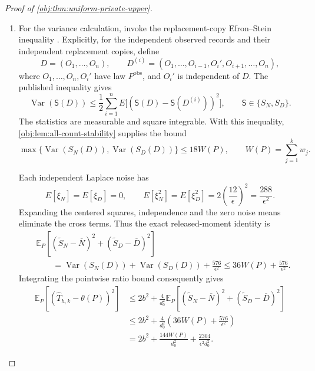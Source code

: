 \documentclass[11pt]{article}
\begin{document}
\begin{proof}[Proof of \cref{obj:thm:uniform-private-upper}]
\begin{enumerate}
\item
For the variance calculation, invoke the replacement-copy Efron--Stein inequality \citep[Theorem~3.1, replacement-copy form, p.~54]{BoucheronLugosiMassart2013}. Explicitly, for the independent observed records and their independent replacement copies, define
\[
D=(O_1,\ldots,O_n),
\qquad
D^{(i)}=(O_1,\ldots,O_{i-1},O_i',O_{i+1},\ldots,O_n),
\]
where \(O_1,\ldots,O_n,O_i'\) have law \(P^{\mathrm{obs}}\), and \(O_i'\) is independent of \(D\). The published inequality gives
\[
\operatorname{Var}(\mathsf S(D))
\le
\frac12\sum_{i=1}^n
E\bigl[(\mathsf S(D)-\mathsf S(D^{(i)}))^2\bigr],
\qquad
\mathsf S\in\{S_N,S_D\}.
\]
The statistics are measurable and square integrable. With this inequality, \cref{obj:lem:all-count-stability} supplies the bound
\[
\max\{\operatorname{Var}(S_N(D)),\operatorname{Var}(S_D(D))\}
\le18W(P),
\qquad
W(P)=\sum_{j=1}^k w_j.
\]

Each independent Laplace noise has
\[
E[\xi_N]=E[\xi_D]=0,
\qquad
E[\xi_N^2]=E[\xi_D^2]
=2\left(\frac{12}{\epsilon}\right)^2
=\frac{288}{\epsilon^2}.
\]
Expanding the centered squares, independence and the zero noise means eliminate the cross terms. Thus the exact released-moment identity is
\[
\begin{aligned}
&\mathbb E_P\left[
(\widetilde S_N-\overline N)^2+
(\widetilde S_D-\overline D)^2
\right]\\
&\qquad=
\operatorname{Var}(S_N(D))
+\operatorname{Var}(S_D(D))
+\frac{576}{\epsilon^2}
\le36W(P)+\frac{576}{\epsilon^2}.
\end{aligned}
\]
Integrating the pointwise ratio bound consequently gives
\[
\begin{aligned}
\mathbb E_P[(\widehat T_{h,k}-\theta(P))^2]
&\le
2b^2+\frac4{d_0^2}
\mathbb E_P\left[
(\widetilde S_N-\overline N)^2+
(\widetilde S_D-\overline D)^2
\right]\\
&\le
2b^2+\frac4{d_0^2}
\left(36W(P)+\frac{576}{\epsilon^2}\right)\\
&=
2b^2+\frac{144W(P)}{d_0^2}
+\frac{2304}{\epsilon^2d_0^2}.
\end{aligned}
\]


\end{enumerate}
\end{proof}
\end{document}
